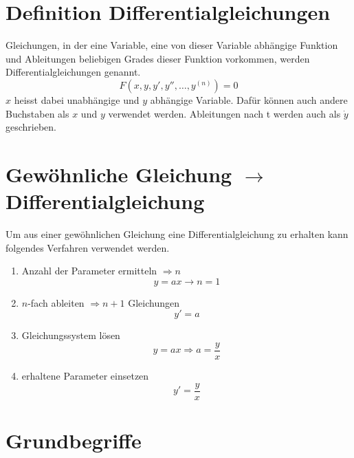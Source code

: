 



\section{Definition Differentialgleichungen}
Gleichungen, in der eine Variable, eine von dieser Variable abhängige Funktion 
und Ableitungen beliebigen Grades dieser Funktion vorkommen, werden 
Differentialgleichungen genannt. 
\[ F(x, y, y', y'', \ldots, y^{(n)})=0 \]
$x$ heisst dabei unabhängige und $y$ abhängige Variable. Dafür können auch 
andere Buchstaben als $x$ und $y$ verwendet werden. 
Ableitungen nach t werden auch als $\dot{y}$ geschrieben. 

\section{Gewöhnliche Gleichung $\to$ Differentialgleichung}
Um aus einer gewöhnlichen Gleichung eine Differentialgleichung zu erhalten
kann folgendes Verfahren verwendet werden.
\begin{enumerate}
	\item Anzahl der Parameter ermitteln $\Rightarrow n$
			\[ y = ax \rightarrow n=1 \]
	\item $n$-fach ableiten $\Rightarrow n+1$ Gleichungen
			\[ y' = a  \]
	\item Gleichungssystem lösen
			\[ y=ax \Rightarrow a=\frac{y}{x} \]
	\item erhaltene Parameter einsetzen	
			\[ y'=\frac{y}{x} \]
\end{enumerate}

\section{Grundbegriffe}

